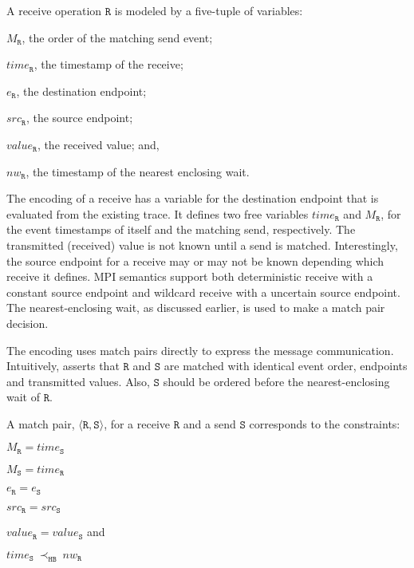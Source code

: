 \begin{definition}[Receive] \label{def:rcv}
A receive operation $\mathtt{R}$ is modeled by a five-tuple of variables:
\begin{compactenum}
\item $M_\mathtt{R}$, the order of the matching send event;
\item $\mathit{time}_\mathtt{R}$, the timestamp of the receive;
\item $e_\mathtt{R}$, the destination endpoint;
\item $src_\mathtt{R}$, the source endpoint;
\item $\mathit{value}_\mathtt{R}$, the received value; and,
\item $\mathit{nw}_\mathtt{R}$, the timestamp of the nearest enclosing wait.
\end{compactenum}
\end{definition}

The encoding of a receive has a variable for the destination endpoint that is evaluated from the existing trace. It defines two free variables $\mathit{time}_\mathtt{R}$ and $M_\mathtt{R}$, for the event timestamps of itself and the matching send, respectively. The transmitted (received) value is not known until a send is matched. Interestingly, the source endpoint for a receive may or may not be known depending which receive it defines. MPI semantics support both deterministic receive with a constant source endpoint and wildcard receive with a uncertain source endpoint. The nearest-enclosing wait, as discussed earlier, is used to make a match pair decision. 

The encoding uses match pairs directly to express the message communication. Intuitively,  asserts that $\mathtt{R}$ and $\mathtt{S}$ are matched with identical event order, endpoints and transmitted values. Also, $\mathtt{S}$ should be ordered before the nearest-enclosing wait of $\mathtt{R}$. 

\begin{definition} \label{def:match}
A match pair, $\langle\mathtt{R}, \mathtt{S}\rangle$, for a receive
$\mathtt{R}$ and a send $\mathtt{S}$ corresponds to the constraints:
\begin{compactenum}
\item $M_{\mathtt{R}} = \mathit{time}_{\mathtt{S}}$
\item $M_{\mathtt{S}} = \mathit{time}_{\mathtt{R}}$
\item $e_{\mathtt{R}} = e_{\mathtt{S}}$
\item $src_\mathtt{R} = src_\mathtt{S}$
\item $\mathit{value}_{\mathtt{R}} = \mathit{value}_{\mathtt{S}}$ and
\item $\mathit{time}_{\mathtt{S}}\ \mathrm{\prec_\mathtt{HB}}\ \mathit{nw}_{\mathtt{R}}$
\end{compactenum}
\end{definition}

